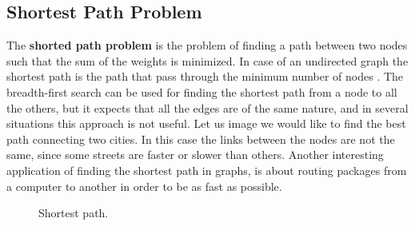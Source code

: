 \subsection{Shortest Path Problem}
The \textbf{shorted path problem} is the problem of finding a path between two nodes such that the sum of the weights is minimized. In case of an undirected graph the shortest path is the path that pass through the minimum number of nodes \cite{wikishortestpath}. The breadth-first search can be used for finding the shortest path from a node to all the others, but it expects that all the edges are of the same nature, and in several situations this approach is not useful. Let us image we would like to find the best path connecting two cities. In this case the links between the nodes are not the same, since some streets are faster or slower than others. Another interesting application of finding the shortest path in graphs, is about routing packages from a computer to another in order to be as fast as possible.

\begin{figure}[H]

\centering
{}

\caption[Shortest path.]{Shortest path.}
\label{graphs_11}
\end{figure}

